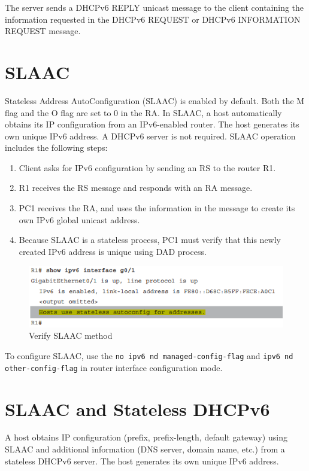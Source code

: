 The server sends a DHCPv6 REPLY unicast message to the client containing the information requested in the DHCPv6 REQUEST or DHCPv6 INFORMATION REQUEST message.

\section{SLAAC}

Stateless Address AutoConfiguration (SLAAC) is enabled by default. Both the M flag and the O flag are set to 0 in the RA. In SLAAC, a host automatically obtains its IP configuration from an IPv6-enabled router. The host generates its own unique IPv6 address. A DHCPv6 server is not required. SLAAC operation includes the following steps:

\begin{enumerate}
\item Client asks for IPv6 configuration by sending an RS to the router R1.
\item R1 receives the RS message and responds with an RA message.
\item PC1 receives the RA, and uses the information in the message to create its own IPv6 global unicast address. 
\item Because SLAAC is a stateless process, PC1 must verify that this newly created IPv6 address is unique using DAD process.
\end{enumerate}

\begin{figure}[hbtp]
\caption{Verify SLAAC method}
\centering
\includegraphics[scale=0.8]{pictures/SLAAC.PNG}
\end{figure}


To configure SLAAC, use the \verb|no ipv6 nd managed-config-flag| and \verb|ipv6 nd other-config-flag| in router interface configuration mode.

\section{SLAAC and Stateless DHCPv6}

A host obtains IP configuration (prefix, prefix-length, default gateway) using SLAAC and additional information (DNS server, domain name, etc.) from a stateless DHCPv6 server. The host generates its own unique IPv6 address. \\

